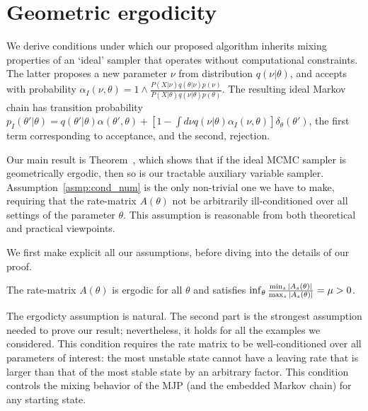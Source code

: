 \newpage
\section{Geometric ergodicity}
We derive conditions under which our proposed algorithm
inherits mixing properties of an `ideal' sampler that operates without
computational constraints. The latter proposes a new parameter $\nu$
from distribution $q(\nu|\theta)$, and accepts with probability 
$\alpha_I(\nu,\theta) = 1 \wedge \frac{P(X | \nu)q(\theta| \nu)p(\nu)}
      {P(X | \theta)q(\nu|\theta)p(\theta)}$. The resulting ideal
Markov chain has transition probability 
$p_I(\theta'|\theta) = q(\theta'|\theta)\alpha(\theta',\theta) + \left[1-\int d\nu
q(\nu|\theta)\alpha_I(\nu,\theta)\right]\delta_\theta(\theta')$, the first
term corresponding to acceptance, and the second, rejection.

Our main result is Theorem~\cite{}, which shows that if the ideal MCMC 
sampler is geometrically ergodic, then so is our tractable auxiliary 
variable sampler. Assumption~\ref{asmp:cond_num} is the only non-trivial 
one we have to make, requiring that the rate-matrix $A(\theta)$ not be 
arbitrarily ill-conditioned over all
settings of the parameter $\theta$. This assumption is reasonable from
both theoretical and practical viewpoints.

We first make explicit all our assumptions, before diving into the details
of our proof.
\begin{assumption}
  The rate-matrix $A(\theta)$ is ergodic for all $\theta$ and satisfies 
  $\inf_\theta \frac{{\min_s |A_s(\theta)|}}{{\max_s |A_s(\theta)|}} = \mu > 0$.
  \label{asmp:cond_num}
\end{assumption}
\noindent The ergodicty assumption is natural. The second part is the
strongest assumption needed to prove our result; nevertheless, it holds 
for all the examples we considered. This condition requires the rate 
matrix to be well-conditioned over all parameters of interest: the most 
unstable state cannot have a leaving rate that is larger than that of
the most stable state by an arbitrary factor. This condition controls the
mixing behavior of the MJP (and the embedded Markov chain) for any 
starting state. 

